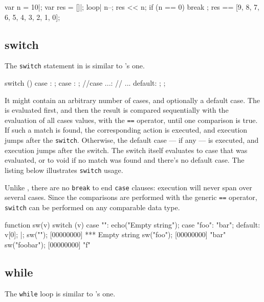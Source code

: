 \begin{urbiassert}
{
  var n = 10|;
  var res = []|;
  loop|
  {
    n--;
    res << n;
    if (n == 0)
      break
  };
  res
}
==
[9, 8, 7, 6, 5, 4, 3, 2, 1, 0];
\end{urbiassert}

\subsection{switch}

The \lstinline|switch| statement in \us is similar to \C's one.

\begin{urbiunchecked}
switch ()
{
  case :
    ;
  case :
    ;
//case ...:
//  ...
  default:
    ;
};
\end{urbiunchecked}

It might contain an arbitrary number of cases, and optionally a
default case. The  is evaluated first, and then the
result is compared sequentially with the evaluation of all cases
values, with the \lstinline|==| operator, until one comparison is
true. If such a match is found, the corresponding action is executed,
and execution jumps after the \lstinline|switch|. Otherwise, the
default case --- if any --- is executed, and execution jumps after the
switch. The switch itself evaluates to case that was evaluated, or to
void if no match was found and there's no default case. The listing below
illustrates \lstinline|switch| usage.

Unlike \C, there are no \lstinline|break| to end \lstinline|case|
clauses: execution will never span over several cases.  Since the
comparisons are performed with the generic \lstinline|==| operator,
\lstinline|switch| can be performed on any comparable data type.

\begin{urbiscript}
function sw(v)
{
  switch (v)
  {
    case "":
      echo("Empty string");
    case "foo":
      "bar";
    default:
      v[0];
  }
}|;
sw("");
[00000000] *** Empty string
sw("foo");
[00000000] "bar"
sw("foobar");
[00000000] "f"
\end{urbiscript}

\subsection{while}

The \lstinline|while| loop is similar to \C's one.

